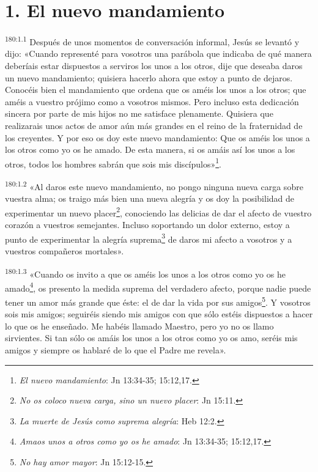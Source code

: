 \section*{1. El nuevo mandamiento}
\par
\textsuperscript{180:1.1} Después de unos momentos de conversación informal, Jesús se levantó y dijo: «Cuando representé para vosotros una parábola que indicaba de qué manera deberíais estar dispuestos a serviros los unos a los otros, dije que deseaba daros un nuevo mandamiento; quisiera hacerlo ahora que estoy a punto de dejaros. Conocéis bien el mandamiento que ordena que os améis los unos a los otros; que améis a vuestro prójimo como a vosotros mismos. Pero incluso esta dedicación sincera por parte de mis hijos no me satisface plenamente. Quisiera que realizarais unos actos de amor aún más grandes en el reino de la fraternidad de los creyentes. Y por eso os doy este nuevo mandamiento: Que os améis los unos a los otros como yo os he amado. De esta manera, si os amáis así los unos a los otros, todos los hombres sabrán que sois mis discípulos»\footnote{\textit{El nuevo mandamiento}: Jn 13:34-35; 15:12,17.}.

\par
\textsuperscript{180:1.2} «Al daros este nuevo mandamiento, no pongo ninguna nueva carga sobre vuestra alma; os traigo más bien una nueva alegría y os doy la posibilidad de experimentar un nuevo placer\footnote{\textit{No os coloco nueva carga, sino un nuevo placer}: Jn 15:11.}, conociendo las delicias de dar el afecto de vuestro corazón a vuestros semejantes. Incluso soportando un dolor externo, estoy a punto de experimentar la alegría suprema\footnote{\textit{La muerte de Jesús como suprema alegría}: Heb 12:2.} de daros mi afecto a vosotros y a vuestros compañeros mortales».

\par
\textsuperscript{180:1.3} «Cuando os invito a que os améis los unos a los otros como yo os he amado\footnote{\textit{Amaos unos a otros como yo os he amado}: Jn 13:34-35; 15:12,17.}, os presento la medida suprema del verdadero afecto, porque nadie puede tener un amor más grande que éste: el de dar la vida por sus amigos\footnote{\textit{No hay amor mayor}: Jn 15:12-15.}. Y vosotros sois mis amigos; seguiréis siendo mis amigos con que sólo estéis dispuestos a hacer lo que os he enseñado. Me habéis llamado Maestro, pero yo no os llamo sirvientes. Si tan sólo os amáis los unos a los otros como yo os amo, seréis mis amigos y siempre os hablaré de lo que el Padre me revela».

